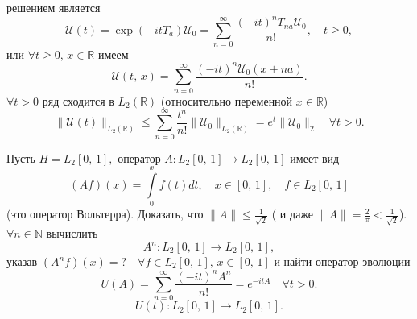  решением является
 \[
	 \mathcal{U}(t)= \exp \left( -i t T_a \right) \mathcal{U}_0=
	 \sum_{n=0}^{\infty} \frac{(-it)^nT_{na}\mathcal{U}_0}{n!},
	 \quad t\ge 0
  ,\]
  или $\forall t \ge 0,\, x \in \mathbb{R}$ имеем
  \[
	  \mathcal{U}(t,\,x)= \sum_{n=0}^{\infty} \frac{(-it)^n
	  \mathcal{U}_0(x+na)}{n!}
  .\] 
  $\forall t > 0$ ряд сходится в $L_2(\mathbb{R})$ (относительно
  переменной $x \in \mathbb{R}$)
  \[
	  \| \mathcal{U}(t)\|_{L_2 (\mathbb{R})}\le 
	  \sum_{n=0}^{\infty} \frac{t^n}{n!}\| \mathcal{U}_0\|_{L_2(\mathbb{R})}=e^t \| \mathcal{U}_0\|_2 \quad \forall t >0
  .\] 
\begin{problem*}
	Пусть $H=L_2[0,\,1],$ оператор  $A: L_2 [0,\,1]\to L_2[0,\,1]$ имеет вид
	\[
		(Af)(x) = \int\limits_{0}^{x} f(t) dt,\quad
		x \in [0,\,1],\quad f \in L_2[0,\,1]
	\]
	(это оператор Вольтерра).
	Доказать, что $\| A\|\le \frac{1}{\sqrt{2} }$ ( и даже
	$\| A\|= \frac{2}{\pi}<\frac{1}{\sqrt{2} }$). 
	$\forall n \in \mathbb{N}$ вычислить
	\[
		A^n: L_2 [0,\,1]\to L_2[0,\,1],
	\]
	указав $(A^n f)(x)=? \quad \forall f \in L_2 [0,\,1],\,
	x \in [0,\,1]$ и найти оператор эволюции
	\[
		U(A)= \sum_{n=0}^{\infty} \frac{(-it)^nA^n}{n!}=
		e ^{-i t A} \quad \forall t >0
	.\]
	\[
		U(t) : L_2[0,\,1]\to L_2 [0,\,1]
	.\] 
\end{problem*}
